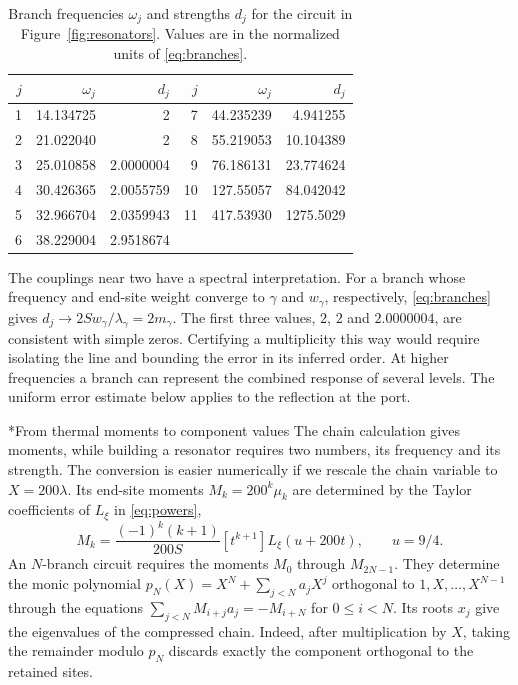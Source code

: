 \documentclass[11pt,letterpaper]{article}
\makeatletter
\renewcommand\subsection{\@startsection{subsection}{2}{\z@}{-2.0ex plus -.3ex}{.75ex}{\normalfont\normalsize\itshape}}
\numberwithin{equation}{section}
\makeatother
\begin{document}
\begin{table}[!htb]
\centering
\begin{tabular}{r@{\quad}rr@{\qquad\qquad}r@{\quad}rr}
\hline
$j$ & $\omega_j$ & $d_j$ & $j$ & $\omega_j$ & $d_j$\\
\hline
1 &14.134725 &2         &7  &44.235239 &4.941255\\
2 &21.022040 &2         &8  &55.219053 &10.104389\\
3 &25.010858 &2.0000004 &9  &76.186131 &23.774624\\
4 &30.426365 &2.0055759 &10 &127.55057 &84.042042\\
5 &32.966704 &2.0359943 &11 &417.53930 &1275.5029\\
6 &38.229004 &2.9518674 & & &\\
\hline
\end{tabular}
\caption{Branch frequencies $\omega_j$ and strengths $d_j$ for the circuit in Figure~\ref{fig:resonators}. Values are in the normalized units of \eqref{eq:branches}.}
\label{tab:resonators}
\end{table}

The couplings near two have a spectral interpretation. For a branch whose frequency and end-site weight converge to $\gamma$ and $w_\gamma$, respectively, \eqref{eq:branches} gives $d_j\to2S w_\gamma/\lambda_\gamma=2m_\gamma$. The first three values, $2$, $2$ and $2.0000004$, are consistent with simple zeros. Certifying a multiplicity this way would require isolating the line and bounding the error in its inferred order. At higher frequencies a branch can represent the combined response of several levels. The uniform error estimate below applies to the reflection at the port.

\subsection*{From thermal moments to component values}
The chain calculation gives moments, while building a resonator requires two numbers, its frequency and its strength. The conversion is easier numerically if we rescale the chain variable to $X=200\lambda$. Its end-site moments $M_k=200^k\mu_k$ are determined by the Taylor coefficients of $L_\xi$ in \eqref{eq:powers},
\[
 M_k=\frac{(-1)^k(k+1)}{200S}[t^{k+1}]L_\xi(u+200t),\qquad u=9/4.
\]
An $N$-branch circuit requires the moments $M_0$ through $M_{2N-1}$. They determine the monic polynomial $p_N(X)=X^N+\sum_{j<N}a_j X^j$ orthogonal to $1,X,\ldots,X^{N-1}$ through the equations $\sum_{j<N}M_{i+j}a_j=-M_{i+N}$ for $0\le i<N$. Its roots $x_j$ give the eigenvalues of the compressed chain. Indeed, after multiplication by $X$, taking the remainder modulo $p_N$ discards exactly the component orthogonal to the retained sites.
\end{document}
